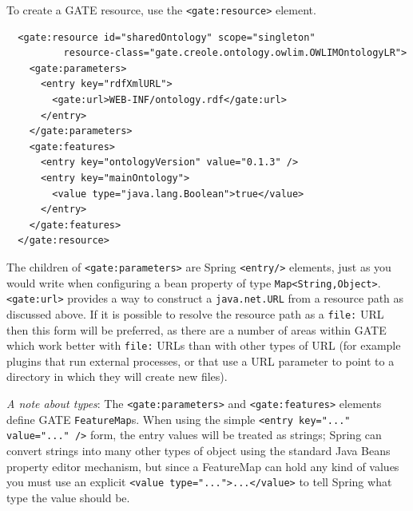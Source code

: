 To create a GATE resource, use the \verb|<gate:resource>| element.
\begin{small}\begin{verbatim}
  <gate:resource id="sharedOntology" scope="singleton"
          resource-class="gate.creole.ontology.owlim.OWLIMOntologyLR">
    <gate:parameters>
      <entry key="rdfXmlURL">
        <gate:url>WEB-INF/ontology.rdf</gate:url>
      </entry>
    </gate:parameters>
    <gate:features>
      <entry key="ontologyVersion" value="0.1.3" />
      <entry key="mainOntology">
        <value type="java.lang.Boolean">true</value>
      </entry>
    </gate:features>
  </gate:resource>
\end{verbatim}\end{small}

The children of \verb|<gate:parameters>| are Spring \verb|<entry/>|
elements, just as you would write when configuring a bean property of
type \verb|Map<String,Object>|.  \verb|<gate:url>| provides a way to construct
a \verb|java.net.URL| from a resource path as discussed above.  If it is
possible to resolve the resource path as a \verb|file:| URL then this form will
be preferred, as there are a number of areas within GATE which work better with
\verb|file:| URLs than with other types of URL (for example plugins that run
external processes, or that use a URL parameter to point to a directory in
which they will create new files).

\emph{A note about types}: The \verb|<gate:parameters>| and
\verb|<gate:features>| elements define GATE \verb|FeatureMap|s.  When using the
simple \verb|<entry key="..." value="..." />| form, the entry values will be
treated as strings; Spring can convert strings into many other types of object
using the standard Java Beans property editor mechanism, but since a FeatureMap
can hold any kind of values you must use an explicit
\verb|<value type="...">...</value>| to tell Spring what type the value should
be.

